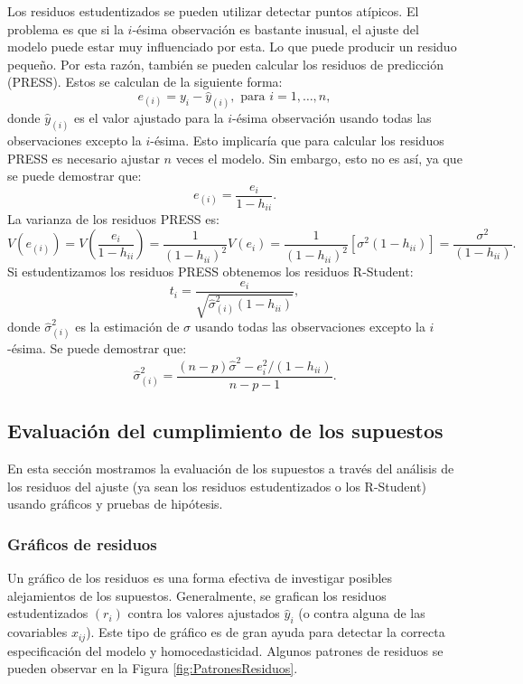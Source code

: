 \documentclass[
]{article}
\begin{document}
Los residuos estudentizados se pueden utilizar detectar puntos atípicos. El problema es que si la \(i\)-ésima observación es bastante inusual, el ajuste del modelo puede estar muy influenciado por esta. Lo que puede producir un residuo pequeño. Por esta razón, también se pueden calcular los residuos de predicción (PRESS). Estos se calculan de la siguiente forma:
\[
e_{(i)} = y_{i} - \widehat{y}_{(i)}, \mbox{ para }i=1,\ldots,n,
\]
donde \(\widehat{y}_{(i)}\) es el valor ajustado para la \(i\)-ésima observación usando todas las observaciones excepto la \(i\)-ésima. Esto implicaría que para calcular los residuos PRESS es necesario ajustar \(n\) veces el modelo. Sin embargo, esto no es así, ya que se puede demostrar que:
\[
e_{(i)} = \frac{e_{i}}{1-h_{ii}}.
\]
La varianza de los residuos PRESS es:
\[
V(e_{(i)}) = V\left( \frac{e_{i}}{1-h_{ii}} \right) = \frac{1}{(1-h_{ii})^{2}}V(e_{i}) = \frac{1}{(1-h_{ii})^{2}} [\sigma^{2}(1-h_{ii})] = \frac{\sigma^{2}}{(1-h_{ii})}.
\]
Si estudentizamos los residuos PRESS obtenemos los residuos R-Student:
\[
t_{i} = \frac{e_{i}}{\sqrt{\widehat{\sigma}^{2}_{(i)}(1-h_{ii})}},
\]
donde \(\widehat{\sigma}^{2}_{(i)}\) es la estimación de \(\sigma\) usando todas las observaciones excepto la \(i\)-ésima. Se puede demostrar que:
\[
\widehat{\sigma}^{2}_{(i)} = \frac{(n-p)\widehat{\sigma}^{2} - e^{2}_{i}/(1-h_{ii})}{n-p-1}.
\]

\subsection{Evaluación del cumplimiento de los supuestos}\label{evaluaciuxf3n-del-cumplimiento-de-los-supuestos}

En esta sección mostramos la evaluación de los supuestos a través del análisis de los residuos del ajuste (ya sean los residuos estudentizados o los R-Student) usando gráficos y pruebas de hipótesis.

\subsubsection{Gráficos de residuos}\label{gruxe1ficos-de-residuos}

Un gráfico de los residuos es una forma efectiva de investigar posibles alejamientos de los supuestos. Generalmente, se grafican los residuos estudentizados \((r_{i})\) contra los valores ajustados \(\widehat{y}_{i}\) (o contra alguna de las covariables \(x_{ij}\)). Este tipo de gráfico es de gran ayuda para detectar la correcta especificación del modelo y homocedasticidad. Algunos patrones de residuos se pueden observar en la Figura \ref{fig:PatronesResiduos}.
\end{document}
